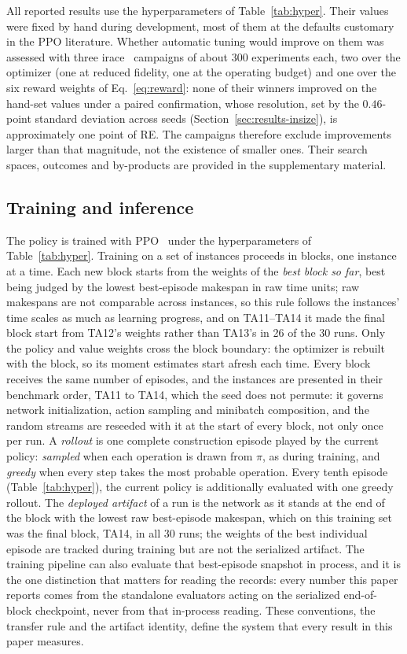 \documentclass[preprint,authoryear,12pt]{elsarticle}
\theoremstyle{definition}
\theoremstyle{remark}
\begin{document}
All reported results use the hyperparameters of
Table~\ref{tab:hyper}. Their values were fixed by hand during
development, most of them at the defaults customary in the PPO
literature. Whether automatic tuning would improve on them was
assessed with three irace~\citep{LopezIbanez2016} campaigns of about
$300$ experiments each, two over the optimizer (one at reduced
fidelity, one at the operating budget) and one over the six reward
weights of Eq.~\eqref{eq:reward}: none of their winners improved on
the hand-set values under a paired confirmation, whose resolution,
set by the $0.46$-point standard deviation across seeds
(Section~\ref{sec:results-insize}), is approximately one point of RE.
The campaigns therefore exclude improvements larger than that
magnitude, not the existence of smaller ones. Their search spaces,
outcomes and by-products are provided in the supplementary
material.

\subsection{Training and inference}
\label{sec:training}

The policy is trained with PPO~\citep{Schulman2017} under the
hyperparameters of Table~\ref{tab:hyper}. Training on a set of
instances proceeds in blocks, one instance at a time. Each new block
starts from the weights of the \emph{best block so far}, best being
judged by the lowest best-episode makespan in raw time units; raw
makespans are not comparable across instances, so this rule follows
the instances' time scales as much as learning progress, and on
TA11--TA14 it made the final block start from TA12's weights rather
than TA13's in 26 of the 30 runs. Only the policy and value weights
cross the block boundary: the optimizer is rebuilt with the block, so
its moment estimates start afresh each time. Every block receives the same
number of episodes, and the instances are presented in their
benchmark order, TA11 to TA14, which the seed does not permute: it
governs network initialization, action sampling and minibatch
composition, and the random streams are reseeded with it at the start
of every block, not only once per run.
A \emph{rollout} is one complete construction episode
played by the current policy: \emph{sampled} when each operation is
drawn from $\pi$, as during training, and \emph{greedy} when every
step takes the most probable operation. Every tenth episode
(Table~\ref{tab:hyper}), the current policy is additionally evaluated
with one greedy rollout. The \emph{deployed artifact} of a run is
the network as it stands at the end of the block with the lowest raw
best-episode makespan, which on this training set was the final
block, TA14, in all 30 runs; the weights of the best individual
episode are tracked during training but are not the serialized
artifact. The training pipeline can also evaluate that best-episode
snapshot in process, and it is the one distinction that matters for
reading the records: every number this paper reports comes from the
standalone evaluators acting on the serialized end-of-block
checkpoint, never from that in-process reading. These conventions,
the transfer rule and the artifact identity, define the system that
every result in this paper measures.
\end{document}
